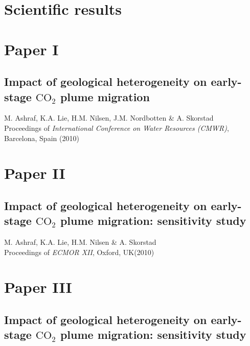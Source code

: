 \chapter{Scientific results}

\pagebreak
\chapter*{Paper I}
\section{Impact of geological heterogeneity on early-stage $\mbox{CO}_2$ plume
migration}

\noindent M. Ashraf, K.A. Lie, H.M. Nilsen, J.M. Nordbotten \& A. Skorstad\\

\noindent Proceedings of \textit{International Conference on Water
Resources (CMWR)}, Barcelona, Spain (2010)
\cleardoublepage



\chapter*{Paper II}
\section{Impact of geological heterogeneity on early-stage $\mbox{CO}_2$
plume migration: sensitivity study}

\noindent M. Ashraf, K.A. Lie, H.M. Nilsen \& A. Skorstad\\

\noindent Proceedings of \textit{ECMOR XII}, Oxford, UK(2010)
\cleardoublepage



\chapter*{Paper III}
\section{Impact of geological heterogeneity on early-stage $\mbox{CO}_2$ plume
migration: sensitivity study}

